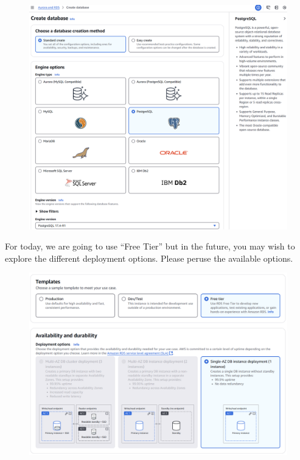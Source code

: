 \documentclass{csse4400}
\begin{document}
\begin{figure}[H]
\includegraphics[trim=0 0 220 0,clip,width=\textwidth]{images/db1}
\end{figure}

\newpage
\noindent
For today, we are going to use ``Free Tier'' but in the future,
you may wish to explore the different deployment options.
Please peruse the available options.


\begin{figure}[H]
  \includegraphics[trim=0 3 0 3,clip,width=\textwidth]{images/db2}
\end{figure}
\end{document}
